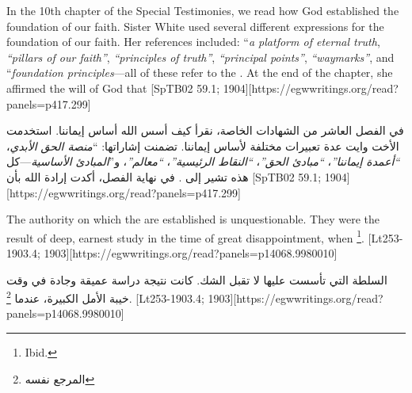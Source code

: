  \label{chap:authority}


 \label{chap:authority}


In the 10th chapter of the Special Testimonies, we read how God established the foundation of our faith. Sister White used several different expressions for the foundation of our faith. Her references included: “\textit{a platform of eternal truth}, \textit{“pillars of our faith”}, \textit{“principles of truth”}, \textit{“principal points”}, \textit{“waymarks”}, and “\textit{foundation principles}—all of these refer to the . At the end of the chapter, she affirmed the will of God that [SpTB02 59.1; 1904][https://egwwritings.org/read?panels=p417.299]


في الفصل العاشر من الشهادات الخاصة، نقرأ كيف أسس الله أساس إيماننا. استخدمت الأخت وايت عدة تعبيرات مختلفة لأساس إيماننا. تضمنت إشاراتها: “\textit{منصة الحق الأبدي}، \textit{“أعمدة إيماننا”}، \textit{“مبادئ الحق”}، \textit{“النقاط الرئيسية”}، \textit{“معالم”}، و”\textit{المبادئ الأساسية}—كل هذه تشير إلى . في نهاية الفصل، أكدت إرادة الله بأن [SpTB02 59.1; 1904][https://egwwritings.org/read?panels=p417.299]


The authority on which the  are established is unquestionable. They were the result of deep, earnest study in the time of great disappointment, when \footnote{Ibid.}. [Lt253-1903.4; 1903][https://egwwritings.org/read?panels=p14068.9980010]


السلطة التي تأسست عليها  لا تقبل الشك. كانت نتيجة دراسة عميقة وجادة في وقت خيبة الأمل الكبيرة، عندما \footnote{المرجع نفسه}. [Lt253-1903.4; 1903][https://egwwritings.org/read?panels=p14068.9980010]


